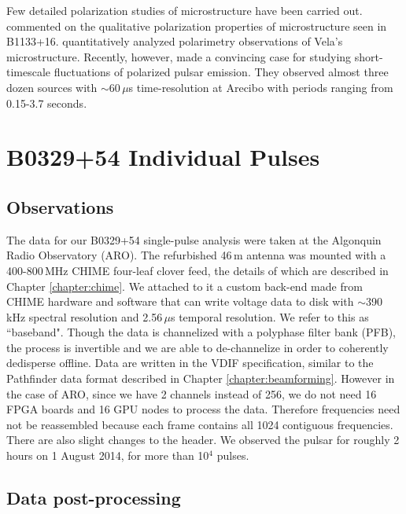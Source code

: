 Few detailed polarization studies of 
microstructure have been carried out. 
\citet{1978A&A....64...27F} commented on the qualitative 
polarization properties of microstructure seen in B1133+16. 
\citet{2002MNRAS.334..523K} quantitatively analyzed polarimetry 
observations of Vela's microstructure. Recently, however, 
\citet{2015ApJ...806..236M} made a convincing case for 
studying short-timescale 
fluctuations of polarized pulsar emission. 
They observed almost three 
dozen sources with $\sim$60\,$\mu$s time-resolution at 
Arecibo with periods ranging from 0.15-3.7 seconds.




\section{B0329+54 Individual Pulses}

\subsection{Observations}

The data for our B0329+54 single-pulse analysis 
were taken at the Algonquin Radio Observatory (ARO). 
The refurbished 46\,m antenna was mounted with a 400-800\,MHz 
CHIME four-leaf clover feed, the details 
of which are described in Chapter \ref{chapter:chime}. 
We attached to it a custom back-end 
made from CHIME hardware and software that can write voltage 
data to disk with $\sim$390\,kHz spectral resolution 
and 2.56\,$\mu$s temporal resolution. We refer to this as ``baseband". 
Though the data is channelized with a polyphase filter bank (PFB),
the process is invertible and we are able to 
de-channelize in order to coherently dedisperse offline. Data are written 
in the VDIF specification, similar to the Pathfinder data format 
described in Chapter \ref{chapter:beamforming}. However in 
the case of ARO, since we have 2 channels instead of 256, we do 
not need 16 FPGA boards and 16 GPU nodes to process the data. 
Therefore frequencies need not be reassembled because 
each frame contains all 1024 contiguous frequencies. There 
are also slight changes to the header. 
We observed the pulsar for roughly 2 hours on 1 August 
2014, for more than 10$^4$ pulses. 


\subsection{Data post-processing}
\label{sec-b0329analysis}

